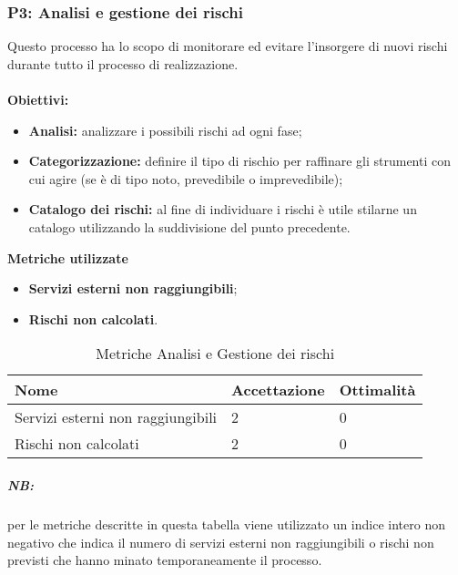 \subsubsection{P3: Analisi e gestione dei rischi}
Questo processo ha lo scopo di monitorare ed evitare l'insorgere di nuovi rischi durante tutto il processo di realizzazione.\\\\
\textbf{Obiettivi:}
\begin{itemize}
	\item\textbf{Analisi:} analizzare i possibili rischi ad ogni fase;
	\item\textbf{Categorizzazione:}  definire il tipo di rischio per raffinare gli strumenti con cui agire (se è di tipo noto, prevedibile o imprevedibile);
	\item\textbf{Catalogo dei rischi:} al fine di individuare i rischi è utile stilarne un catalogo utilizzando la suddivisione del punto precedente.\\
\end{itemize}
\textbf{Metriche utilizzate}
\begin{itemize}
	\item{\textbf{Servizi esterni non raggiungibili};}
	\item{\textbf{Rischi non calcolati}.}
\end{itemize}
\begin{table}[!htbp]
	\centering
	\renewcommand{\arraystretch}{2} 
		\begin{tabular}{|l|l|l|}
			\rowcolor{orange!50}
			\hline
			Nome & Accettazione & Ottimalità \\
			\hline
			Servizi esterni non raggiungibili & 2 & 0 \\
			\hline
			Rischi non calcolati & 2 & 0 \\
			\hline
		\end{tabular}
	\caption{Metriche Analisi e Gestione dei rischi}
\end{table}
\subparagraph{\textbf{NB}:} per le metriche descritte in questa tabella viene utilizzato un indice intero non negativo che indica il numero di servizi esterni non raggiungibili o rischi non previsti che hanno minato temporaneamente il processo.
\newpage
